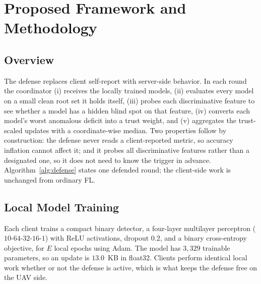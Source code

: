 \documentclass[journal]{IEEEtran}
\begin{document}
\section{Proposed Framework and Methodology}

\subsection{Overview}
The defense replaces client self-report with server-side behavior. In each round the coordinator (i) receives the locally trained models, (ii) evaluates every model on a small clean root set it holds itself, (iii) probes each discriminative feature to see whether a model has a hidden blind spot on that feature, (iv) converts each model's worst anomalous deficit into a trust weight, and (v) aggregates the trust-scaled updates with a coordinate-wise median. Two properties follow by construction: the defense never reads a client-reported metric, so accuracy inflation cannot affect it; and it probes all discriminative features rather than a designated one, so it does not need to know the trigger in advance. Algorithm~\ref{alg:defense} states one defended round; the client-side work is unchanged from ordinary FL.

\subsection{Local Model Training}
Each client trains a compact binary detector, a four-layer multilayer perceptron ($10\text{-}64\text{-}32\text{-}16\text{-}1$) with ReLU activations, dropout $0.2$, and a binary cross-entropy objective, for $E$ local epochs using Adam. The model has $3{,}329$ trainable parameters, so an update is $13.0$~KB in float32. Clients perform identical local work whether or not the defense is active, which is what keeps the defense free on the UAV side.
\end{document}
